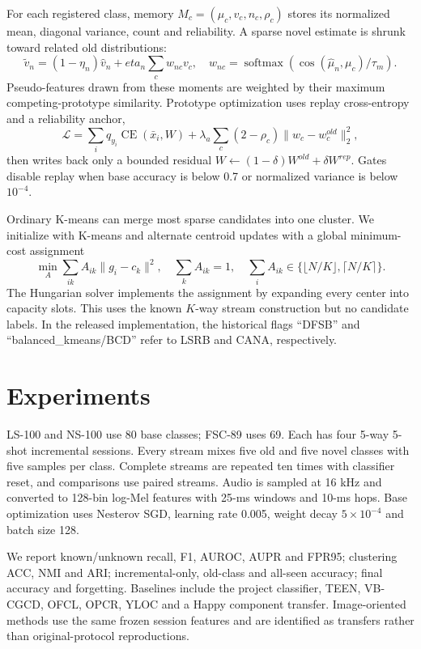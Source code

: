 \documentclass[conference]{IEEEtran}
\begin{document}
For each registered class, memory $M_c=(\mu_c,v_c,n_c,\rho_c)$ stores its normalized mean,
diagonal variance, count and reliability. A sparse novel estimate is shrunk toward related
old distributions:
\begin{equation}
\widetilde v_n=(1-\eta_n)\widehat v_n+eta_n\sum_c w_{nc}v_c,\quad
w_{nc}=\operatorname{softmax}(\cos(\widehat\mu_n,\mu_c)/\tau_m).
\end{equation}
Pseudo-features drawn from these moments are weighted by their maximum competing-prototype
similarity. Prototype optimization uses replay cross-entropy and a reliability anchor,
\begin{equation}
\mathcal L=\sum_i q_{y_i}\operatorname{CE}(\bar x_i,W)+
\lambda_a\sum_c(2-\rho_c)\lVert w_c-w_c^{old}\rVert_2^2,
\end{equation}
then writes back only a bounded residual
$W\leftarrow(1-\delta)W^{old}+\delta W^{rep}$. Gates disable replay when base accuracy is
below 0.7 or normalized variance is below $10^{-4}$.

Ordinary K-means can merge most sparse candidates into one cluster. We initialize with
K-means and alternate centroid updates with a global minimum-cost assignment
\begin{equation}
\min_A\sum_{ik}A_{ik}\lVert g_i-c_k\rVert^2,\quad
\sum_k A_{ik}=1,\quad \sum_i A_{ik}\in\{\lfloor N/K\rfloor,\lceil N/K\rceil\}.
\end{equation}
The Hungarian solver implements the assignment by expanding every center into capacity
slots. This uses the known $K$-way stream construction but no candidate labels.
In the released implementation, the historical flags ``DFSB'' and
``balanced\_kmeans/BCD'' refer to LSRB and CANA, respectively.

\section{Experiments}
LS-100 and NS-100 use 80 base classes; FSC-89 uses 69. Each has four 5-way 5-shot
incremental sessions. Every stream mixes five old and five novel classes with five samples
per class. Complete streams are repeated ten times with classifier reset, and comparisons
use paired streams. Audio is sampled at 16 kHz and converted to 128-bin log-Mel features
with 25-ms windows and 10-ms hops. Base optimization uses Nesterov SGD, learning rate
0.005, weight decay $5\times10^{-4}$ and batch size 128.

We report known/unknown recall, F1, AUROC, AUPR and FPR95; clustering ACC, NMI and ARI;
incremental-only, old-class and all-seen accuracy; final accuracy and forgetting. Baselines
include the project classifier, TEEN, VB-CGCD, OFCL, OPCR, YLOC and a Happy component
transfer. Image-oriented methods use the same frozen session features and are identified as
transfers rather than original-protocol reproductions.
\end{document}
